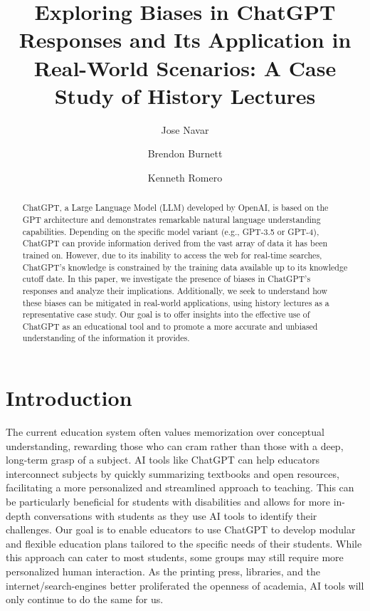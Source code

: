 \documentclass[letterpaper, 10pt, conference]{ieeeconf}
\title{\LARGE \bf
Exploring Biases in ChatGPT Responses and Its Application in Real-World Scenarios: A Case Study of History Lectures
}
\author[1]{Jose Navar}
\author[2]{Brendon Burnett}
\author[3]{Kenneth Romero}
\affil[1,2,3]{\emph{University of North Georgia}}
\begin{document}
    \maketitle
    \begin{abstract}
        ChatGPT, a Large Language Model (LLM) developed by OpenAI, is based on the GPT architecture and demonstrates remarkable natural language understanding capabilities. Depending on the specific model variant (e.g., GPT-3.5 or GPT-4), ChatGPT can provide information derived from the vast array of data it has been trained on. However, due to its inability to access the web for real-time searches, ChatGPT's knowledge is constrained by the training data available up to its knowledge cutoff date. In this paper, we investigate the presence of biases in ChatGPT's responses and analyze their implications. Additionally, we seek to understand how these biases can be mitigated in real-world applications, using history lectures as a representative case study. Our goal is to offer insights into the effective use of ChatGPT as an educational tool and to promote a more accurate and unbiased understanding of the information it provides.
    \end{abstract}

    \section{Introduction}
    The current education system often values memorization over conceptual understanding, rewarding those who can cram rather than those with a deep, long-term grasp of a subject. AI tools like ChatGPT can help educators interconnect subjects by quickly summarizing textbooks and open resources, facilitating a more personalized and streamlined approach to teaching. This can be particularly beneficial for students with disabilities and allows for more in-depth conversations with students as they use AI tools to identify their challenges. Our goal is to enable educators to use ChatGPT to develop modular and flexible education plans tailored to the specific needs of their students. While this approach can cater to most students, some groups may still require more personalized human interaction. As the printing press, libraries, and the internet/search-engines better proliferated the openness of academia, AI tools will only continue to do the same for us.
\end{document}
